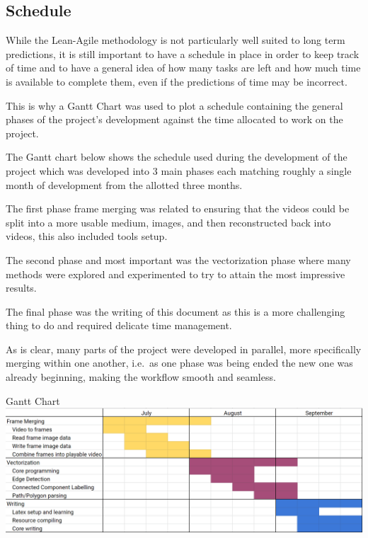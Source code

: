 \documentclass[12pt]{article}
\newcommand{\sentence}{} %
\begin{document}
    \subsection{Schedule}\label{subsec:schedule}

    \tab
    While the Lean-Agile methodology is not particularly well suited to long term predictions, it is still important
    to have a schedule in place in order to keep track of time and to have a general idea of how many tasks are left
    and how much time is available to complete them, even if the predictions of time may be incorrect.
    \sentence
    This is why a Gantt Chart was used to plot a schedule containing the general phases of the project's development
    against the time allocated to work on the project.
    \sentence
    The Gantt chart below shows the schedule used during the development of the project which was developed into 3
    main phases each matching roughly a single month of development from the allotted three months.
    \sentence
    The first phase frame merging was related to ensuring that the videos could be split into a more usable medium,
    images, and then reconstructed back into videos, this also included tools setup.
    \sentence
    The second phase and most important was the vectorization phase where many methods were explored and experimented
    to try to attain the most impressive results.
    \sentence
    The final phase was the writing of this document as this is a more challenging thing to do and required delicate
    time management.
    \sentence
    As is clear, many parts of the project were developed in parallel, more specifically merging within one another,
    i.e.\ as one phase was being ended the new one was already beginning, making the workflow smooth and seamless.

    \pagebreak
    \thispagestyle{empty}
    \begin{landscape}
        \begin{center}
            \huge{Gantt Chart}
            \vspace{1cm}
            \linebreak
            \normalsize
            \includegraphics[scale=0.53]{Gantt.png}
        \end{center}
    \end{landscape}
    \pagebreak
\end{document}
